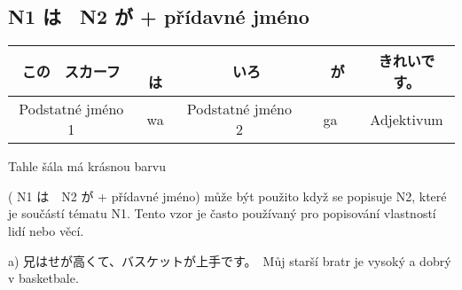 \subsection{N1 は　N2 が + přídavné jméno}
\begin{center}
\begin{tabular}{||c|c||c|c||c||}
\hline
この　スカーフ&　は&　いろ&　が　&きれいです。 \\
\hline
Podstatné jméno 1 & wa & Podstatné jméno 2 & ga& Adjektivum\\
\hline
\end{tabular}
\end{center}

Tahle šála má krásnou barvu
 
 
 
( N1 は　N2 が + přídavné jméno) může být použito když se popisuje N2, které je součástí tématu N1. Tento vzor je často používaný pro popisování vlastností lidí nebo věcí.

a) 兄はせが高くて、バスケットが上手です。　Můj starší bratr je vysoký a dobrý v basketbale. 



















